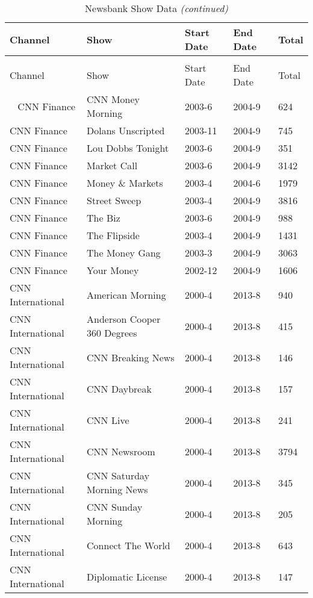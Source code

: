 \begin{longtable}{lllll}
\caption{\label{tab:newsbank_summary}Newsbank Show Data}\\
\toprule
Channel & Show & Start Date & End Date & Total \\ 
\midrule
\endfirsthead
\caption[]{Newsbank Show Data \textit{(continued)}}\\
\toprule
Channel & Show & Start Date & End Date & Total \\ 
\midrule
\endhead
\
\endfoot
\bottomrule
\endlastfoot
CNN Finance & CNN Money Morning & 2003-6 & 2004-9 & 624 \\ 
  CNN Finance & Dolans Unscripted & 2003-11 & 2004-9 & 745 \\ 
  CNN Finance & Lou Dobbs Tonight & 2003-6 & 2004-9 & 351 \\ 
  CNN Finance & Market Call & 2003-6 & 2004-9 & 3142 \\ 
  CNN Finance & Money \& Markets & 2003-4 & 2004-6 & 1979 \\ 
  CNN Finance & Street Sweep & 2003-4 & 2004-9 & 3816 \\ 
  CNN Finance & The Biz & 2003-6 & 2004-9 & 988 \\ 
  CNN Finance & The Flipside & 2003-4 & 2004-9 & 1431 \\ 
  CNN Finance & The Money Gang & 2003-3 & 2004-9 & 3063 \\ 
  CNN Finance & Your Money & 2002-12 & 2004-9 & 1606 \\ 
  CNN International & American Morning & 2000-4 & 2013-8 & 940 \\ 
  CNN International & Anderson Cooper 360 Degrees & 2000-4 & 2013-8 & 415 \\ 
  CNN International & CNN Breaking News & 2000-4 & 2013-8 & 146 \\ 
  CNN International & CNN Daybreak & 2000-4 & 2013-8 & 157 \\ 
  CNN International & CNN Live & 2000-4 & 2013-8 & 241 \\ 
  CNN International & CNN Newsroom & 2000-4 & 2013-8 & 3794 \\ 
  CNN International & CNN Saturday Morning News & 2000-4 & 2013-8 & 345 \\ 
  CNN International & CNN Sunday Morning & 2000-4 & 2013-8 & 205 \\ 
  CNN International & Connect The World & 2000-4 & 2013-8 & 643 \\ 
  CNN International & Diplomatic License & 2000-4 & 2013-8 & 147 \\ 

\end{longtable}

